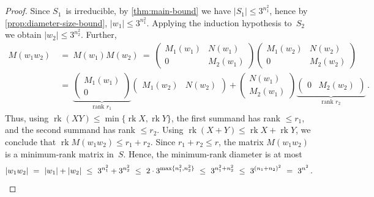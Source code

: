 \documentclass[10pt,a4paper]{amsart}
\newcommand{\rk}{\operatorname{rk}}
\begin{document}
\begin{proof}
Since $S_1$~is irreducible, by \cref{thm:main-bound} we have $|S_1| \le 3^{n_1^2}$, hence by \cref{prop:diameter-size-bound}, $|w_1| \le 3^{n_1^2}$.
Applying the induction hypothesis to~$S_2$ we obtain $|w_2| \le 3^{n_2^2}$.
Further,
\begin{align*}
M(w_1 w_2) \ &= \ M(w_1) M(w_2) \ = \ 
\begin{pmatrix}
    M_1(w_1) & N(w_1) \\ 0 & M_2(w_1)
\end{pmatrix}
\begin{pmatrix}
    M_1(w_2) & N(w_2) \\ 0 & M_2(w_2)
\end{pmatrix} \\
&= \ 
\underbrace{\begin{pmatrix}
    M_1(w_1) \\ 0 
\end{pmatrix}}_{\text{rank } r_1}
\begin{pmatrix}
    M_1(w_2) & N(w_2)
\end{pmatrix}
+
\begin{pmatrix}
    N(w_1) \\ M_2(w_1)
\end{pmatrix}
\underbrace{
\begin{pmatrix}
   0 & M_2(w_2)
\end{pmatrix}
}_{\text{rank } r_2}\,.
\end{align*}
Thus, using $\rk(X Y) \le \min \{\rk X, \rk Y\}$, the first summand has rank $\le r_1$, and the second summand has rank $\le r_2$.
Using $\rk(X + Y) \le \rk X + \rk Y$, we conclude that $\rk M(w_1 w_2) \le r_1 + r_2$.
Since $r_1 + r_2 \le r$, the matrix $M(w_1 w_2)$ is a minimum-rank matrix in~$S$.
Hence, the minimum-rank diameter is at most
\[
  |w_1 w_2| \ = \ |w_1| + |w_2| \ \le \ 3^{n_1^2} + 3^{n_2^2} \ \le \ 2 \cdot 3^{\max\{n_1^2, n_2^2\}} \ \le \ 3^{n_1^2 + n_2^2} \ \le \ 3^{(n_1+n_2)^2} \ = \ 3^{n^2}\,. \qedhere
\]
\end{proof}
\end{document}
